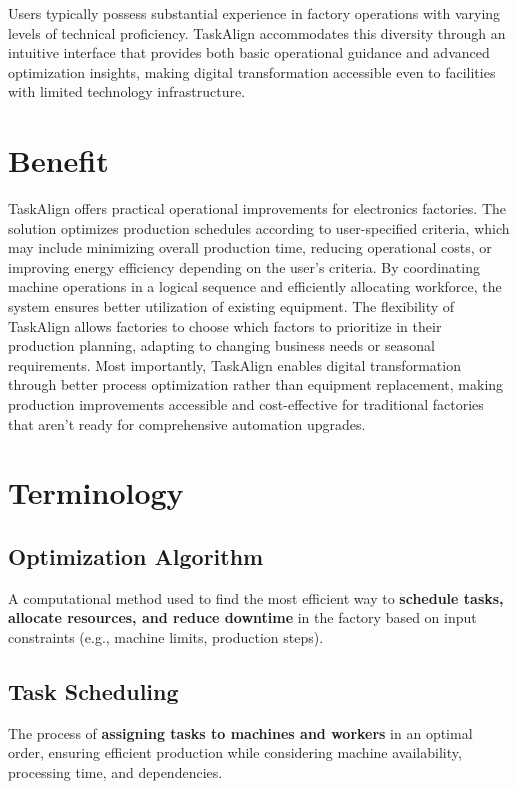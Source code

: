 Users typically possess substantial experience in factory operations with varying levels of technical proficiency. TaskAlign accommodates this diversity through an intuitive interface that provides both basic operational guidance and advanced optimization insights, making digital transformation accessible even to facilities with limited technology infrastructure.

\section{Benefit}
\label{section:benefit}

TaskAlign offers practical operational improvements for electronics factories. The solution optimizes production schedules according to user-specified criteria, which may include minimizing overall production time, reducing operational costs, or improving energy efficiency depending on the user's criteria. By coordinating machine operations in a logical sequence and efficiently allocating workforce, the system ensures better utilization of existing equipment.
The flexibility of TaskAlign allows factories to choose which factors to prioritize in their production planning, adapting to changing business needs or seasonal requirements. 
Most importantly, TaskAlign enables digital transformation through better process optimization rather than equipment replacement, making production improvements accessible and cost-effective for traditional factories that aren't ready for comprehensive automation upgrades.

\section{Terminology}
\label{section:terminology}

\subsection{Optimization Algorithm}
A computational method used to find the most efficient way to \textbf{schedule tasks, allocate resources, and reduce downtime} in the factory based on input constraints (e.g., machine limits, production steps).  

\subsection{Task Scheduling}
The process of \textbf{assigning tasks to machines and workers} in an optimal order, ensuring efficient production while considering machine availability, processing time, and dependencies.

